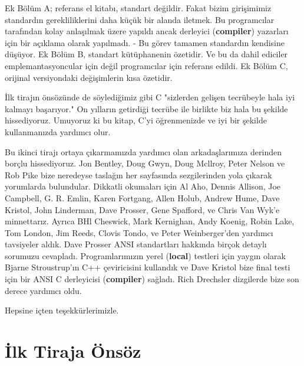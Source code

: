 \documentclass[a4paper,12pt,oneside]{book}
\begin{document}
\par Ek Bölüm A; referans el kitabı, standart değildir. Fakat bizim girişimimiz standardın gerekliliklerini daha küçük bir alanda iletmek. Bu programcılar tarafından kolay anlaşılmak üzere yapıldı ancak derleyici (\textbf{compiler}) yazarları için bir açıklama olarak yapılmadı. - Bu görev tamamen standardın kendisine düşüyor. Ek Bölüm B, standart kütüphanenin özetidir. Ve bu da dahil ediciler emplemantasyoncular için değil programcılar için referans edildi. Ek Bölüm C, orijinal versiyondaki değişimlerin kısa özetidir.
\par İlk tirajın önsözünde de söylediğimiz gibi C "sizlerden gelişen tecrübeyle hala iyi kalmayı başarıyor." On yılların getirdiği tecrübe ile birlikte biz hala bu şekilde hissediyoruz. Umuyoruz ki bu kitap, C'yi öğrenmenizde ve iyi bir şekilde kullanmanızda yardımcı olur.
\par Bu ikinci tirajı ortaya çıkarmamızda yardımcı olan arkadaşlarımıza derinden borçlu hissediyoruz.  Jon Bentley, Doug Gwyn, Doug Mcllroy, Peter Nelson ve Rob Pike bize neredeyse taslağın her sayfasında sezgilerinden yola çıkarak yorumlarda bulundular. Dikkatli okumaları için  Al Aho, Dennis Allison, Joe Campbell, G. R. Emlin, Karen Fortgang, Allen Holub, Andrew Hume, Dave Kristol, John Linderman, Dave Prosser, Gene Spafford, ve Chris Van Wyk'e minnettarız. Ayrıca  BHl Cheswick, Mark Kernighan, Andy Koenig, Robin Lake, Tom London, Jim Reeds, Clovis Tondo, ve Peter Weinberger'den yardımcı tavsiyeler aldık. Dave Prosser ANSI standartları hakkında birçok detaylı sorumuzu cevapladı. Programlarımızın yerel (\textbf{local}) testleri için yaygın olarak  Bjarne Stroustrup'ın C++ çeviricisini kullandık ve Dave Kristol bize final testi için bir ANSI C derleyicisi (\textbf{compiler}) sağladı. Rich Drechsler dizgilerde bize son derece yardımcı oldu.
\par Hepsine içten teşekkürlerimizle.
\newline

\noindent \hspace*{270pt}{Brian W. Kernighan \\}
\hspace*{280pt}{Dennis M. Ritchie}

\chapter*{İlk Tiraja Önsöz}
\end{document}
